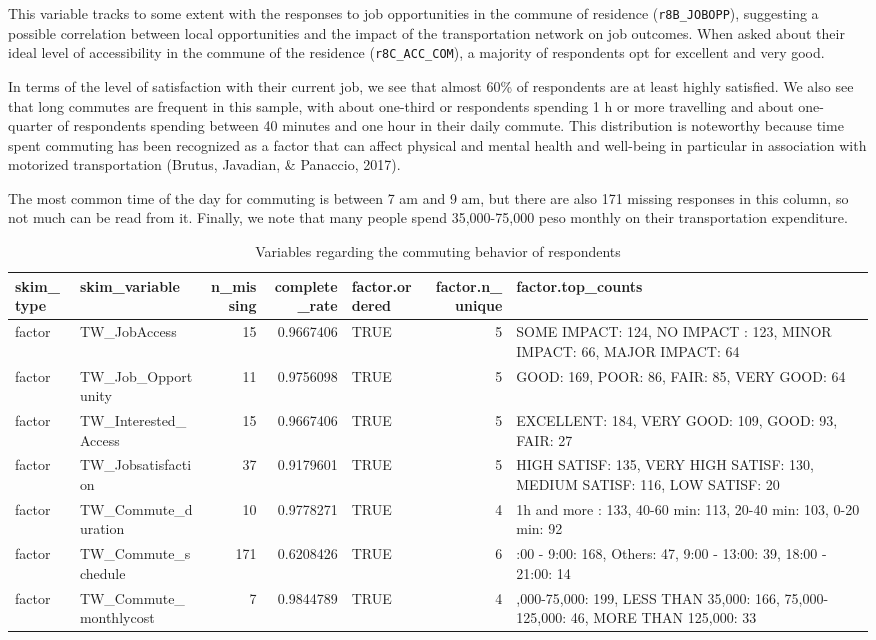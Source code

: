 \documentclass[
11pt, %
oneside, %
english, %
singlespacing, %
]{macthesis} %
\newcommand{\blandscape}{\begin{landscape}}
\newcommand{\elandscape}{\end{landscape}}
\begin{document}
This variable tracks to some extent with the responses to job opportunities in the commune of residence (\texttt{r8B\_JOBOPP}), suggesting a possible correlation between local opportunities and the impact of the transportation network on job outcomes. When asked about their ideal level of accessibility in the commune of the residence (\texttt{r8C\_ACC\_COM}), a majority of respondents opt for excellent and very good.

In terms of the level of satisfaction with their current job, we see that almost 60\% of respondents are at least highly satisfied. We also see that long commutes are frequent in this sample, with about one-third or respondents spending 1 h or more travelling and about one-quarter of respondents spending between 40 minutes and one hour in their daily commute. This distribution is noteworthy because time spent commuting has been recognized as a factor that can affect physical and mental health and well-being in particular in association with motorized transportation (Brutus, Javadian, \& Panaccio, 2017).

The most common time of the day for commuting is between 7 am and 9 am, but there are also 171 missing responses in this column, so not much can be read from it. Finally, we note that many people spend 35,000-75,000 peso monthly on their transportation expenditure.

\newpage
\blandscape
\begin{table}

\caption{\label{tab:unnamed-chunk-11}\label{tab:Travel-work-Descriptive}Variables regarding the commuting behavior of respondents}
\centering
\fontsize{7}{9}\selectfont
\begin{tabular}[t]{llrrlr>{\raggedright\arraybackslash}p{10em}}
\toprule
skim\_type & skim\_variable & n\_missing & complete\_rate & factor.ordered & factor.n\_unique & factor.top\_counts\\
\midrule
factor & TW\_JobAccess & 15 & 0.9667406 & TRUE & 5 & SOME IMPACT: 124, NO IMPACT : 123, MINOR IMPACT: 66, MAJOR IMPACT: 64\\
factor & TW\_Job\_Opportunity & 11 & 0.9756098 & TRUE & 5 & GOOD: 169, POOR: 86, FAIR: 85, VERY GOOD: 64\\
factor & TW\_Interested\_Access & 15 & 0.9667406 & TRUE & 5 & EXCELLENT: 184, VERY GOOD: 109, GOOD: 93, FAIR: 27\\
factor & TW\_Jobsatisfaction & 37 & 0.9179601 & TRUE & 5 & HIGH SATISF: 135, VERY HIGH SATISF: 130, MEDIUM SATISF: 116, LOW SATISF: 20\\
factor & TW\_Commute\_duration & 10 & 0.9778271 & TRUE & 4 & 1h and more : 133, 40-60 min: 113, 20-40 min: 103, 0-20 min: 92\\
\addlinespace
factor & TW\_Commute\_schedule & 171 & 0.6208426 & TRUE & 6 & 7:00 - 9:00: 168, Others: 47, 9:00 - 13:00: 39, 18:00 - 21:00: 14\\
factor & TW\_Commute\_monthlycost & 7 & 0.9844789 & TRUE & 4 & 35,000-75,000: 199, LESS THAN 35,000: 166, 75,000-125,000: 46, MORE THAN 125,000: 33\\
\bottomrule
\end{tabular}
\end{table}
\elandscape
\newpage
\end{document}
